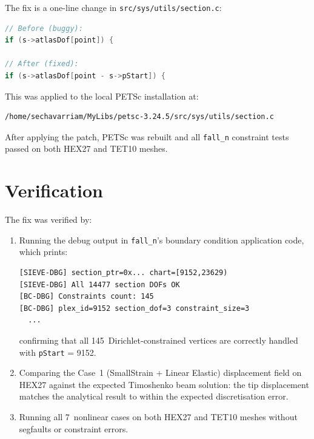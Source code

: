The fix is a one-line change in
\texttt{src/sys/utils/section.c}:

\begin{lstlisting}[language=C]
// Before (buggy):
if (s->atlasDof[point]) {

// After (fixed):
if (s->atlasDof[point - s->pStart]) {
\end{lstlisting}

This was applied to the local PETSc installation at:
\begin{lstlisting}[basicstyle=\ttfamily\footnotesize,breaklines=true]
/home/sechavarriam/MyLibs/petsc-3.24.5/src/sys/utils/section.c
\end{lstlisting}

After applying the patch, PETSc was rebuilt and all \texttt{fall\_n} constraint
tests passed on both HEX27 and TET10 meshes.


\section{Verification}
\label{sec:petsc_verification}

The fix was verified by:
\begin{enumerate}[nosep]
  \item Running the debug output in \texttt{fall\_n}'s boundary condition
        application code, which prints:
\begin{lstlisting}[basicstyle=\ttfamily\footnotesize]
[SIEVE-DBG] section_ptr=0x... chart=[9152,23629)
[SIEVE-DBG] All 14477 section DOFs OK
[BC-DBG] Constraints count: 145
[BC-DBG] plex_id=9152 section_dof=3 constraint_size=3
  ...
\end{lstlisting}
        confirming that all 145~Dirichlet-constrained vertices are correctly
        handled with \texttt{pStart} = 9152.

  \item Comparing the Case~1 (SmallStrain + Linear Elastic) displacement field
        on HEX27 against the expected Timoshenko beam solution: the
        tip displacement matches the analytical result to within the expected
        discretisation error.

  \item Running all 7~nonlinear cases on both HEX27 and TET10 meshes without
        segfaults or constraint errors.
\end{enumerate}


